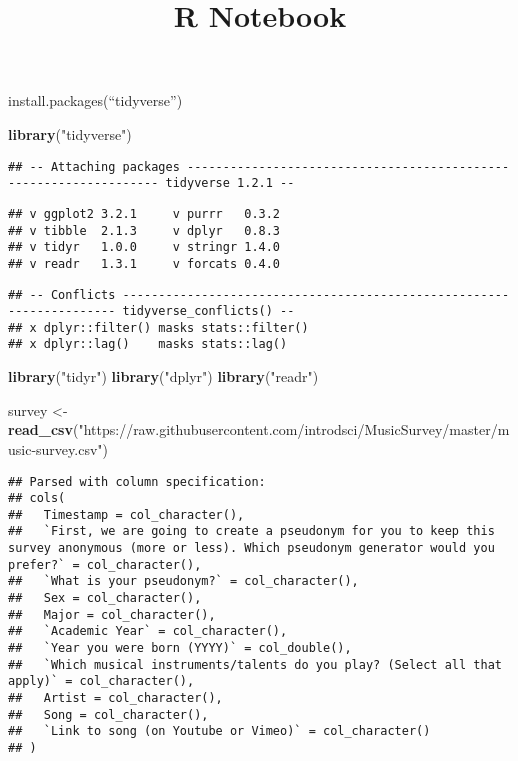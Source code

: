 \documentclass[]{article}
\title{R Notebook}
\author{}
\date{}
\newenvironment{Shaded}{\begin{snugshade}}{\end{snugshade}}
\newcommand{\KeywordTok}[1]{\textcolor[rgb]{0.13,0.29,0.53}{\textbf{#1}}}
\newcommand{\NormalTok}[1]{#1}
\newcommand{\StringTok}[1]{\textcolor[rgb]{0.31,0.60,0.02}{#1}}
\begin{document}
\maketitle

install.packages(``tidyverse'')

\begin{Shaded}
\begin{Highlighting}[]
\KeywordTok{library}\NormalTok{(}\StringTok{"tidyverse"}\NormalTok{)}
\end{Highlighting}
\end{Shaded}

\begin{verbatim}
## -- Attaching packages ------------------------------------------------------------------ tidyverse 1.2.1 --
\end{verbatim}

\begin{verbatim}
## v ggplot2 3.2.1     v purrr   0.3.2
## v tibble  2.1.3     v dplyr   0.8.3
## v tidyr   1.0.0     v stringr 1.4.0
## v readr   1.3.1     v forcats 0.4.0
\end{verbatim}

\begin{verbatim}
## -- Conflicts --------------------------------------------------------------------- tidyverse_conflicts() --
## x dplyr::filter() masks stats::filter()
## x dplyr::lag()    masks stats::lag()
\end{verbatim}

\begin{Shaded}
\begin{Highlighting}[]
\KeywordTok{library}\NormalTok{(}\StringTok{"tidyr"}\NormalTok{)}
\KeywordTok{library}\NormalTok{(}\StringTok{"dplyr"}\NormalTok{)}
\KeywordTok{library}\NormalTok{(}\StringTok{"readr"}\NormalTok{)}
\end{Highlighting}
\end{Shaded}

\begin{Shaded}
\begin{Highlighting}[]
\NormalTok{survey <-}\StringTok{ }\KeywordTok{read_csv}\NormalTok{(}\StringTok{"https://raw.githubusercontent.com/introdsci/MusicSurvey/master/music-survey.csv"}\NormalTok{)}
\end{Highlighting}
\end{Shaded}

\begin{verbatim}
## Parsed with column specification:
## cols(
##   Timestamp = col_character(),
##   `First, we are going to create a pseudonym for you to keep this survey anonymous (more or less). Which pseudonym generator would you prefer?` = col_character(),
##   `What is your pseudonym?` = col_character(),
##   Sex = col_character(),
##   Major = col_character(),
##   `Academic Year` = col_character(),
##   `Year you were born (YYYY)` = col_double(),
##   `Which musical instruments/talents do you play? (Select all that apply)` = col_character(),
##   Artist = col_character(),
##   Song = col_character(),
##   `Link to song (on Youtube or Vimeo)` = col_character()
## )
\end{verbatim}
\end{document}
